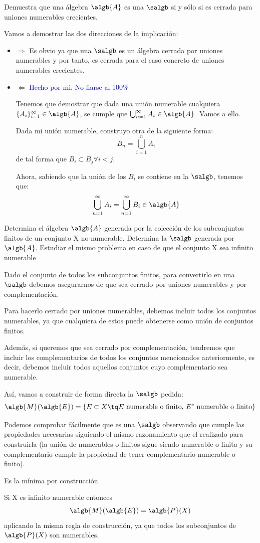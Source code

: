 \begin{problem}[6]
Demuestra que una álgebra $\algb{A}$ es una $\salgb$ si y sólo si es cerrada para uniones numerables crecientes.

\solution
Vamos a demostrar las dos direcciones de la implicación:
\begin{itemize}
\item $\Rightarrow$
Es obvio ya que una $\salgb$ es un álgebra cerrada por uniones numerables y por tanto, es cerrada para el caso concreto de uniones numerables crecientes.
\item $\Leftarrow$
\textcolor{blue}{Hecho por mi. No fiarse al 100\%}

Tenemos que demostrar que dada una unión numerable cualquiera $\{A_i\}_{i=1}^{\infty} \in \algb{A}$, se cumple que $\bigcup_{n=1}^{\infty} A_i \in \algb{A}$. Vamos a ello.

Dada mi unión numerable, construyo otra de la siguiente forma:
\[B_n = \bigcup_{i=1}^{n} A_i\]
de tal forma que $B_i \subset B_j \forall i<j$.

Ahora, sabiendo que la unión de los $B_i$ se contiene en la $\salgb$, tenemos que:
\[\bigcup_{n=1}^{\infty} A_i=\bigcup_{n=1}^{\infty} B_i \in \algb{A}\]

\end{itemize}
\end{problem}

\begin{problem}[7]
Determina el álgebra $\algb{A}$ generada por la colección de los subconjuntos finitos de un conjunto X no-numerable. Determina la $\salgb$ generada por $\algb{A}$. Estudiar el mismo problema en caso de que el conjunto X sea infinito numerable

\solution
Dado el conjunto de todos los subconjuntos finitos, para convertirlo en una $\salgb$ debemos asegurarnos de que sea cerrado por uniones numerables y por complementación.

Para hacerlo cerrado por uniones numerables, debemos incluir todos los conjuntos numerables, ya que cualquiera de estos puede obtenerse como unión de conjuntos finitos.

Además, si queremos que sea cerrado por complementación, tendremos que incluir los complementarios de todos los conjuntos mencionados anteriormente, es decir, debemos incluir todos aquellos conjuntos cuyo complementario sea numerable.

Así, vamos a construir de forma directa la $\salgb$ pedida:
\[\algb{M}(\algb{E})=\{ E\subset X \tq E \text{ numerable o finito, } E^c \text{ numerable o finito}\}\]

Podemos comprobar fácilmente que es una $\salgb$ observando que cumple las propiedades necesarias siguiendo el mismo razonamiento que el realizado para construirla (la unión de numerables o finitos sigue siendo numerable o finita y su complementario cumple la propiedad de tener complementario numerable o finito).

Es la mínima por construcción.

Si X es infinito numerable entonces
\[\algb{M}(\algb{E})=\algb{P}(X)\]
aplicando la misma regla de construcción, ya que todos los subconjuntos de $\algb{P}(X)$ son numerables.
\end{problem}

